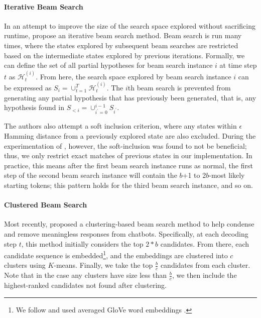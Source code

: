 \paragraph{Iterative Beam Search}\quad
In an attempt to improve the size of the search space explored without sacrificing runtime, \citet{kulikov2018importance} propose an iterative beam search method.
Beam search is run many times, where the states explored by subsequent beam searches are restricted based on the intermediate states explored by previous iterations.
Formally, we can define the set of all partial hypotheses for beam search instance $i$ at time step $t$ as $\mathcal{H}_t^{(i)}$. From here, the search space explored by beam search instance $i$ can be expressed as $S_i = \cup_{t=1}^T \mathcal{H}_t^{(i)}$.
The $i$th beam search is prevented from generating any partial hypothesis that has previously been generated, that is, any hypothesis found in $S_{<i} = \cup_{i^{\prime}=0}^{i-1}S_{i^{\prime}}$.

The authors also attempt a soft inclusion criterion, where any states within $\epsilon$ Hamming distance from a previously explored state are also excluded. During the experimentation of \citet{kulikov2018importance}, however, the soft-inclusion was found to not be beneficial; thus, we only restrict exact matches of previous states in our implementation.
In practice, this means after the first beam search instance runs as normal, the first step of the second beam search instance will contain the $b$+1 to 2$b$-most likely starting tokens; this pattern holds for the third beam search instance, and so on.

\paragraph{Clustered Beam Search}\quad
Most recently, \citet{tam2019clustered} proposed a clustering-based beam search method to help condense and remove meaningless responses from chatbots.
Specifically, at each decoding step $t$, this method initially considers the top $2*b$ candidates. From there, each candidate sequence is embedded\footnote{We follow \citet{tam2019clustered} and used averaged GloVe word embeddings \cite{pennington2014glove}.}, and the embeddings are clustered into $c$ clusters using $K$-means. Finally, we take the top $\frac{b}{c}$ candidates from each cluster. Note that in the case any clusters have size less than $\frac{b}{c}$, we then include the highest-ranked candidates not found after clustering.

